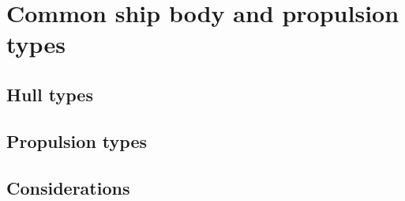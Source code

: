 \section{Common ship body and propulsion types}

\subsection{Hull types}

\subsection{Propulsion types}

\subsection{Considerations}